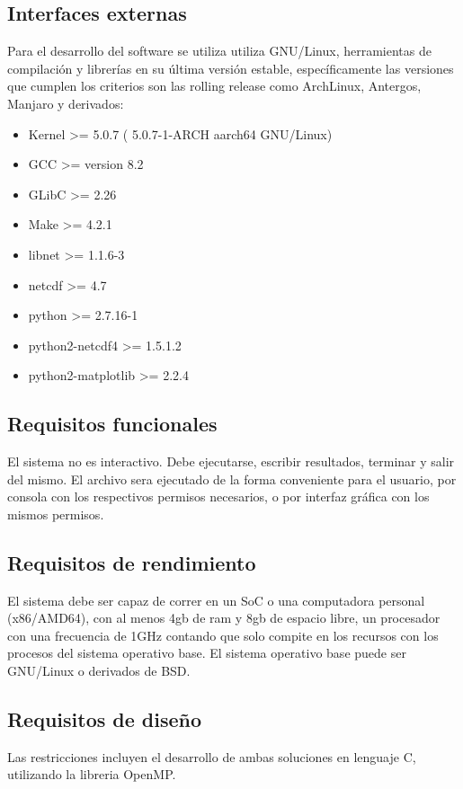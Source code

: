 \documentclass{article}
\begin{document}
\subsection{Interfaces externas}
Para el desarrollo del software se utiliza utiliza GNU/Linux, herramientas de compilación y librerías en su última versión estable, específicamente las versiones que cumplen los criterios son las rolling release como ArchLinux, Antergos, Manjaro y derivados:
\begin{itemize}
\item Kernel >= 5.0.7  ( 5.0.7-1-ARCH aarch64 GNU/Linux)
\item GCC >= version 8.2 
\item GLibC >= 2.26
\item Make >= 4.2.1
\item libnet >= 1.1.6-3 
\item netcdf  >= 4.7
\item python >= 2.7.16-1
\item python2-netcdf4  >= 1.5.1.2
\item python2-matplotlib  >= 2.2.4
\end{itemize}
\subsection{Requisitos funcionales}
El sistema no es interactivo. Debe ejecutarse, escribir resultados, terminar y salir del mismo. El archivo sera ejecutado de la forma conveniente para el usuario, por consola con
los respectivos permisos necesarios, o por interfaz gráfica con los mismos permisos.\\

\subsection{Requisitos de rendimiento}
El sistema debe ser capaz de correr en un SoC o una computadora personal (x86/AMD64), con al menos 4gb de ram y 8gb de espacio libre, un procesador con una frecuencia de 1GHz contando que solo compite en los recursos con los procesos del sistema operativo base. El sistema operativo base puede ser GNU/Linux o derivados de BSD.\\
\subsection{Requisitos de diseño}
Las restricciones incluyen el desarrollo de ambas soluciones en lenguaje C, utilizando la libreria OpenMP.\\
\end{document}
